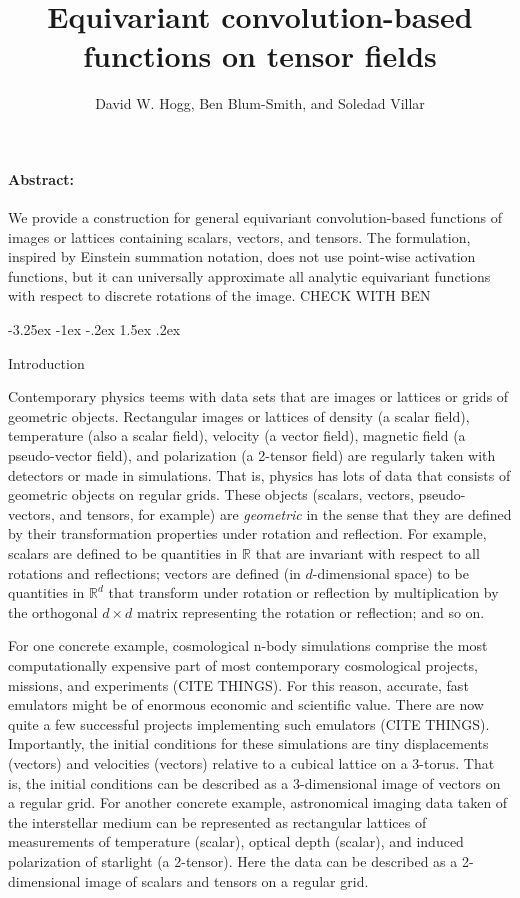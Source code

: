 \documentclass{article}
\title{\bfseries%
Equivariant convolution-based functions
on tensor fields}
\author{David W. Hogg, Ben Blum-Smith, and Soledad Villar}
\date{}
\makeatletter
\theoremstyle{plain}
\renewcommand\section{\@startsection {section}{1}{\z@}%
  {-3.25ex \@plus -1ex \@minus -.2ex}%
  {1.5ex \@plus .2ex}%
  {\raggedright\normalfont\large\bfseries}}
\makeatother
\begin{document}
\maketitle\thispagestyle{empty}

\paragraph{Abstract:} We provide a construction for general equivariant convolution-based functions of images or lattices
containing scalars, vectors, and tensors. The formulation, inspired by Einstein summation notation, does not use point-wise activation functions, but it can universally approximate all analytic equivariant functions with respect to discrete rotations of the image. CHECK WITH BEN

\section{Introduction}

Contemporary physics teems with data sets that are images or lattices or grids of geometric objects.
Rectangular images or lattices of density (a scalar field), temperature (also a scalar field), velocity (a vector field), magnetic field (a pseudo-vector field), and polarization (a 2-tensor field) are regularly taken with detectors or made in simulations.
That is, physics has lots of data that consists of geometric objects on regular grids.
These objects (scalars, vectors, pseudo-vectors, and tensors, for example) are \emph{geometric} in the sense that they are defined by their transformation properties under rotation and reflection.
For example, scalars are defined to be quantities in $\mathbb R$ that are invariant with respect to all rotations and reflections; vectors are defined (in $d$-dimensional space) to be quantities in $\mathbb R^d$ that transform under rotation or reflection by multiplication by the orthogonal $d\times d$ matrix representing the rotation or reflection; and so on.

For one concrete example, cosmological n-body simulations comprise the most computationally expensive part of most contemporary cosmological projects, missions, and experiments (CITE THINGS).
For this reason, accurate, fast emulators might be of enormous economic and scientific value.
There are now quite a few successful projects implementing such emulators (CITE THINGS).
Importantly, the initial conditions for these simulations are tiny displacements (vectors) and velocities (vectors) relative to a cubical lattice on a 3-torus.
That is, the initial conditions can be described as a 3-dimensional image of vectors on a regular grid.
For another concrete example, astronomical imaging data taken of the interstellar medium can be represented as rectangular lattices of measurements of temperature (scalar), optical depth (scalar), and induced polarization of starlight (a 2-tensor).
Here the data can be described as a 2-dimensional image of scalars and tensors on a regular grid.
\end{document}
